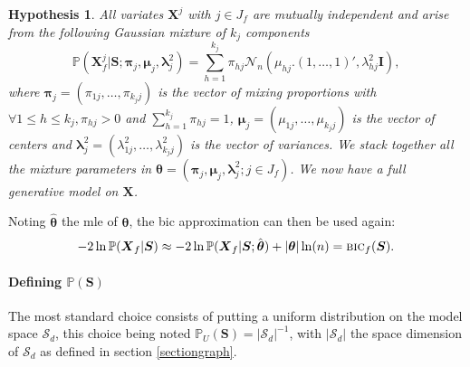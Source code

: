 \documentclass[12pt,a4paper]{report}
\newtheorem{hyp}{Hypothesis}
\begin{document}
\begin{hyp}\label{H4}
All variates $\boldsymbol{X}^j$ with $j \in J_f$ are mutually independent and arise from the following Gaussian mixture of $k_j$ components
\begin{equation}
\mathbb{P}(\boldsymbol{X}_f^j|\boldsymbol{S};\boldsymbol{\pi}_{j},\boldsymbol{\mu}_j,\boldsymbol{\lambda}^2_j) = \sum_{h=1}^{k_j} \pi_{hj} \mathcal{N}_n(\mu_{hj} . (1,\ldots,1)',\lambda_{hj}^2\boldsymbol{I}),
\end{equation}
where $\boldsymbol{\pi}_{j}=(\pi_{1j},\ldots,\pi_{k_jj})$ is the vector of mixing proportions with $\forall 1\leq h\leq k_j , \pi_{hj}>0$ and $\sum_{h=1}^{k_j}\pi_{hj}=1$, $\boldsymbol{\mu}_j=(\mu_{1j},\ldots,\mu_{k_jj})$  is the vector of centers and $\boldsymbol{\lambda}^2_j=(\lambda^2_{1j},\ldots,\lambda^2_{k_jj})$ is the vector of variances. We stack together all the mixture parameters in $\boldsymbol{\theta}=(\boldsymbol{\pi}_{j},\boldsymbol{\mu}_j,\boldsymbol{\lambda}^2_j ; j \in J_f)$. We now have a full generative model on $\boldsymbol{X}$.

\end{hyp}
		 

\vspace{3mm}

Noting $\hat{\boldsymbol{\theta}}$ the {\sc mle} of $\boldsymbol{\theta}$, the {\sc bic} approximation can then be used again:
\begin{equation}
-2\ln \mathbb{P}(\boldsymbol{X}_f|\boldsymbol{S}) \approx -2\ln \mathbb{P}(\boldsymbol{X}_f|\boldsymbol{S};\hat{\boldsymbol{\theta}}) + |{\boldsymbol{\theta}}| \ln(n) = \mbox{{\sc bic}}_f(\boldsymbol{S}).
\end{equation}

\paragraph{Defining $\mathbb{P}(\boldsymbol{S})$} The most standard choice consists of putting a uniform distribution on the model space $\mathcal{S}_d$, this choice being noted $\mathbb{P}_U(\boldsymbol{S}) = |\mathcal{S}_d|^{-1}$, with $|\mathcal{S}_d|$ the space dimension of $\mathcal{S}_d$ as defined in section \ref{sectiongraph}.
		
	
\end{document}
